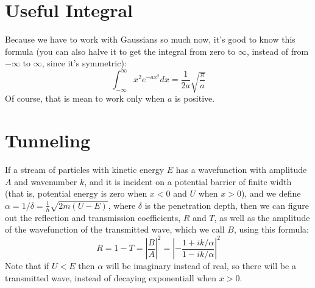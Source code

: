 \documentclass[12pt]{article}
\begin{document}
\section{Useful Integral}
Because we have to work with Gaussians so much now, it's good to know this formula (you can also halve it to get the integral from zero to $\infty$, instead of from $-\infty$ to $\infty$, since it's symmetric):
\[ \int_{-\infty}^\infty x^2 e^{-ax^2} dx = \frac{1}{2a} \sqrt{ \frac{\pi}{a} } \]
Of course, that is mean to work only when $a$ is positive.

\section{Tunneling}
If a stream of particles with kinetic energy $E$ has a wavefunction with amplitude $A$ and wavenumber $k$, and it is incident on a potential barrier of finite width (that is, potential energy is zero when $x<0$ and $U$ when $x>0$), and we define $\alpha = 1/\delta = \frac{1}{\hbar} \sqrt{2m(U-E)}$, where $\delta$ is the penetration depth, then we can figure out the reflection and transmission coefficients, $R$ and $T$, as well as the amplitude of the wavefunction of the transmitted wave, which we call $B$, using this formula:
\[ R = 1 - T = \left| \frac{B}{A} \right|^2 = \left| - \frac{1 + ik / \alpha}{1 - ik / \alpha} \right|^2 \]
Note that if $U<E$ then $\alpha$ will be imaginary instead of real, so there will be a transmitted wave, instead of decaying exponentiall when $x>0$.
\end{document}
